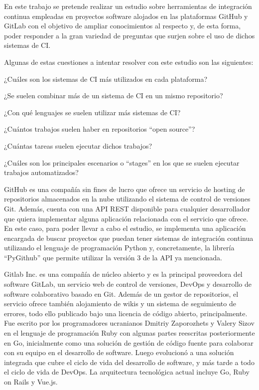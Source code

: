 En este trabajo se pretende realizar un estudio sobre herramientas de integración continua empleadas en proyectos software alojados en las plataformas GitHub y GitLab con el objetivo de ampliar conocimientos al respecto y, de esta forma, poder responder a la gran variedad de preguntas que surjen sobre el uso de dichos sistemas de CI.

Algunas de estas cuestiones a intentar resolver con este estudio son las siguientes:
\begin{compactitem}
    \item ¿Cuáles son los sistemas de CI más utilizados en cada plataforma?
    \item ¿Se suelen combinar más de un sistema de CI en un mismo repositorio?
    \item ¿Con qué lenguajes se suelen utilizar más sistemas de CI?
    \item ¿Cuántos trabajos suelen haber  en repositorios ``open source''?
    \item ¿Cuántas tareas suelen ejecutar dichos trabajos?
    \item ¿Cuáles son los principales escenarios o ``stages'' en los que se suelen ejecutar trabajos automatizados?
\end{compactitem}

GitHub es una compañía sin fines de lucro que ofrece un servicio de hosting de repositorios almacenados en la nube utilizando el sistema de control de versiones Git. 
Además, cuenta con una API REST disponible para cualquier desarrollador que quiera implementar alguna aplicación relacionada con el servicio que ofrece. 
En este caso, para poder llevar a cabo el estudio, se implementa una aplicación encargada de buscar proyectos que puedan tener sistemas de integración continua utilizando el lenguaje de programación Python y, concretamente, la librería “PyGithub” que permite utilizar la versión 3 de la API ya mencionada.

Gitlab Inc. es una compañía de núcleo abierto y es la principal proveedora del software GitLab, un servicio web de control de versiones, DevOps y desarrollo de software colaborativo basado en Git. Además de un gestor de repositorios, el servicio ofrece también alojamiento de wikis y un sistema de seguimiento de errores, todo ello publicado bajo una licencia de código abierto, principalmente.
Fue escrito por los programadores ucranianos Dmitriy Zaporozhets y Valery Sizov en el lenguaje de programación Ruby con algunas partes reescritas posteriormente en Go, inicialmente como una solución de gestión de código fuente para colaborar con su equipo en el desarrollo de software. Luego evolucionó a una solución integrada que cubre el ciclo de vida del desarrollo de software, y más tarde a todo el ciclo de vida de DevOps. 
La arquitectura tecnológica actual incluye Go, Ruby on Rails y Vue.js.

